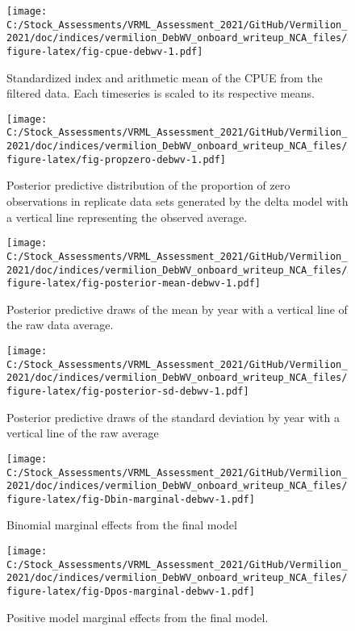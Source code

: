 \documentclass[11pt,
  english,
  a4paper,
]{article}
\begin{document}
\begin{figure}
\centering
\texttt{[image: C:/Stock\_Assessments/VRML\_Assessment\_2021/GitHub/Vermilion\_2021/doc/indices/vermilion\_DebWV\_onboard\_writeup\_NCA\_files/figure-latex/fig-cpue-debwv-1.pdf]}
\caption{\label{fig:fig-cpue-debwv}Standardized index and arithmetic mean of the CPUE from the filtered data. Each timeseries is scaled to its respective means.}
\end{figure}

\begin{figure}
\centering
\texttt{[image: C:/Stock\_Assessments/VRML\_Assessment\_2021/GitHub/Vermilion\_2021/doc/indices/vermilion\_DebWV\_onboard\_writeup\_NCA\_files/figure-latex/fig-propzero-debwv-1.pdf]}
\caption{\label{fig:fig-propzero-debwv}Posterior predictive distribution of the proportion of zero observations in replicate data sets generated by the delta model with a vertical line representing the observed average.}
\end{figure}

\begin{figure}
\centering
\texttt{[image: C:/Stock\_Assessments/VRML\_Assessment\_2021/GitHub/Vermilion\_2021/doc/indices/vermilion\_DebWV\_onboard\_writeup\_NCA\_files/figure-latex/fig-posterior-mean-debwv-1.pdf]}
\caption{\label{fig:fig-posterior-mean-debwv}Posterior predictive draws of the mean by year with a vertical line of the raw data average.}
\end{figure}

\begin{figure}
\centering
\texttt{[image: C:/Stock\_Assessments/VRML\_Assessment\_2021/GitHub/Vermilion\_2021/doc/indices/vermilion\_DebWV\_onboard\_writeup\_NCA\_files/figure-latex/fig-posterior-sd-debwv-1.pdf]}
\caption{\label{fig:fig-posterior-sd-debwv}Posterior predictive draws of the standard deviation by year with a vertical line of the raw average}
\end{figure}

\begin{figure}
\centering
\texttt{[image: C:/Stock\_Assessments/VRML\_Assessment\_2021/GitHub/Vermilion\_2021/doc/indices/vermilion\_DebWV\_onboard\_writeup\_NCA\_files/figure-latex/fig-Dbin-marginal-debwv-1.pdf]}
\caption{\label{fig:fig-Dbin-marginal-debwv}Binomial marginal effects from the final model}
\end{figure}

\begin{figure}
\centering
\texttt{[image: C:/Stock\_Assessments/VRML\_Assessment\_2021/GitHub/Vermilion\_2021/doc/indices/vermilion\_DebWV\_onboard\_writeup\_NCA\_files/figure-latex/fig-Dpos-marginal-debwv-1.pdf]}
\caption{\label{fig:fig-Dpos-marginal-debwv}Positive model marginal effects from the final model.}
\end{figure}
\end{document}
